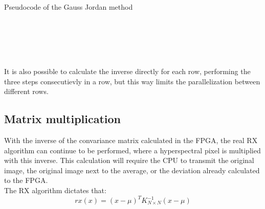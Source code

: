 \begin{algorithm}
  \caption{Pseudocode of the Gauss Jordan method}
  \begin{algorithmic}[1]
    \Statex
       
         
      		\EndIf
      	\EndFor
      \EndIf
      \EndFor
      \EndFor
      \\
      \\
       
      \EndFor
      \EndFor
      \\
      \\
       
      \EndFor
    \EndFunction
  \end{algorithmic}
\end{algorithm}

It is also possible to calculate the inverse directly for each row, performing the three steps consecutievly in a row, but this way limits the parallelization between different rows.

\clearpage

\subsection{Matrix multiplication}
With the inverse of the convariance matrix calculated in the FPGA, the real RX algorithm can continue to be performed, where a hyperspectral pixel is multiplied with this inverse. This calculation will require the CPU to transmit the original image, the original image next to the average, or the deviation already calculated to the FPGA.
\\
\noindent The RX algorithm dictates that:
\[ rx(x) = (x-\mu)^{T} K^{-1}_{N \times N} (x-\mu) \]


